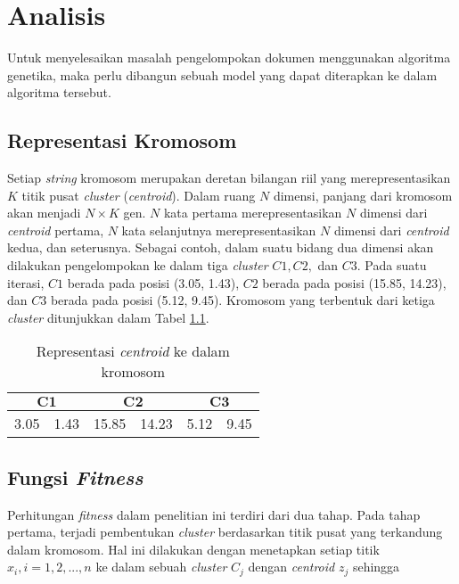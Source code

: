 \chapter{Analisis}
\label{chap:analisis}

Untuk menyelesaikan masalah pengelompokan dokumen menggunakan algoritma genetika, maka perlu dibangun sebuah model yang dapat diterapkan ke dalam algoritma tersebut.

\section{Representasi Kromosom}
Setiap \textit{string} kromosom merupakan deretan bilangan riil yang merepresentasikan $K$ titik pusat \textit{cluster} (\textit{centroid}). Dalam ruang $N$ dimensi, panjang dari kromosom akan menjadi $N\times K$ gen. $N$ kata pertama merepresentasikan $N$ dimensi dari \textit{centroid} pertama, $N$ kata selanjutnya merepresentasikan $N$ dimensi dari \textit{centroid} kedua, dan seterusnya. Sebagai contoh, dalam suatu bidang dua dimensi akan dilakukan pengelompokan ke dalam tiga \textit{cluster} $C1, C2,$ dan $C3$. Pada suatu iterasi, $C1$ berada pada posisi (3.05, 1.43), $C2$ berada pada posisi (15.85, 14.23), dan $C3$ berada pada posisi (5.12, 9.45). Kromosom yang terbentuk dari ketiga \textit{cluster} ditunjukkan dalam Tabel \ref{tbl:chromosome}.

\begin{table}[h]
	\centering
	\begin{tabular}{|c|c|c|c|c|c|}
		\multicolumn{2}{c}{\textbf{$\mathbf{C1}$}} & \multicolumn{2}{c}{\textbf{$\mathbf{C2}$}} & \multicolumn{2}{c}{$\mathbf{C3}$}\\ \hline
		3.05 & 1.43 & 15.85 & 14.23 & 5.12 & 9.45\\ \hline
	\end{tabular}
	\caption{Representasi \textit{centroid} ke dalam kromosom}
	\label{tbl:chromosome}
\end{table}

\section{Fungsi \textit{Fitness}}
Perhitungan \textit{fitness} dalam penelitian ini terdiri dari dua tahap. Pada tahap pertama, terjadi pembentukan \textit{cluster} berdasarkan titik pusat yang terkandung dalam kromosom. Hal ini dilakukan dengan menetapkan setiap titik $x_i,i=1,2, ... ,n$ ke dalam sebuah \textit{cluster} $C_j$ dengan \textit{centroid} $z_j$ sehingga

